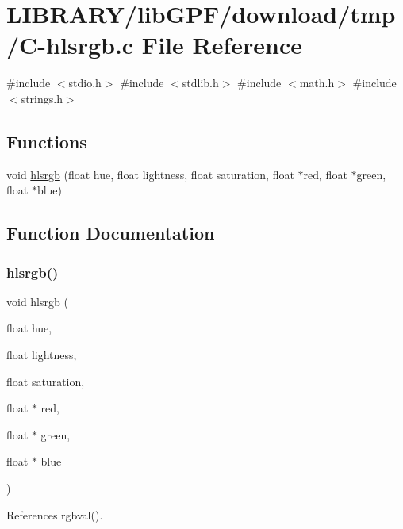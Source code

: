 \hypertarget{C-hlsrgb_8c}{}\section{L\+I\+B\+R\+A\+R\+Y/lib\+G\+P\+F/download/tmp/\+C-\/hlsrgb.c File Reference}
\label{C-hlsrgb_8c}
{\ttfamily \#include $<$stdio.\+h$>$}\newline
{\ttfamily \#include $<$stdlib.\+h$>$}\newline
{\ttfamily \#include $<$math.\+h$>$}\newline
{\ttfamily \#include $<$strings.\+h$>$}\newline
\subsection*{Functions}
\begin{DoxyCompactItemize}
\item 
void \hyperlink{C-hlsrgb_8c_ad9e23862110e6afd4136221b830b29e7}{hlsrgb} (float hue, float lightness, float saturation, float $\ast$red, float $\ast$green, float $\ast$blue)
\end{DoxyCompactItemize}


\subsection{Function Documentation}
\mbox{\label{C-hlsrgb_8c_ad9e23862110e6afd4136221b830b29e7}} 
\subsubsection{\texorpdfstring{hlsrgb()}{hlsrgb()}}
{\footnotesize\ttfamily void hlsrgb (\begin{DoxyParamCaption}\item[{float}]{hue,  }\item[{float}]{lightness,  }\item[{float}]{saturation,  }\item[{float $\ast$}]{red,  }\item[{float $\ast$}]{green,  }\item[{float $\ast$}]{blue }\end{DoxyParamCaption})}



References rgbval().

